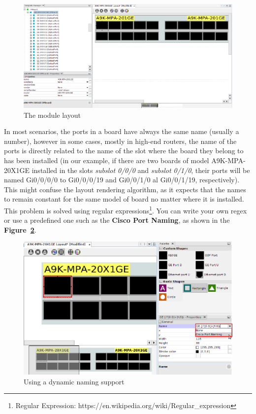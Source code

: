 \documentclass[a4paper]{article}
\begin{document}
	\begin{figure}[h!]
		\centering
		\includegraphics[width=0.99\linewidth]{img/device_layout_ipboard.png}
		\caption{The module layout}
		\label{fig:device_layout_ipboard}
	\end{figure}
    \newpage
    
	In most scenarios, the ports in a board have always the same name (usually a number), however in some cases, mostly in high-end routers, the name of the ports is directly related to the name of the slot where the board they belong to has been installed (in our example, if there are two boards of model A9K-MPA-20X1GE installed in the slots \textit{subslot 0/0/0} and \textit{subslot 0/1/0}, their ports will be named  Gi0/0/0/0 to Gi0/0/0/19 and  Gi0/0/1/0 al Gi0/0/1/19, respectively). This might confuse the layout rendering algorithm, as it expects that the names to remain constant for the same model of board no matter where it is installed. This problem is solved using regular expressions\footnote{Regular Expression: https://en.wikipedia.org/wiki/Regular\_expression}. You can write your own regex or use a predefined one such as the \textbf{Cisco Port Naming}, as shown in the \textbf{Figure~\ref{fig:device_layout_port_naming}}.
	
	\begin{figure}[h!]
		\centering
		\includegraphics[width=0.99\linewidth]{img/device_layout_port_naming.png}
		\caption{Using a dynamic naming support}
		\label{fig:device_layout_port_naming}
	\end{figure}
    \newpage
	
\end{document}
